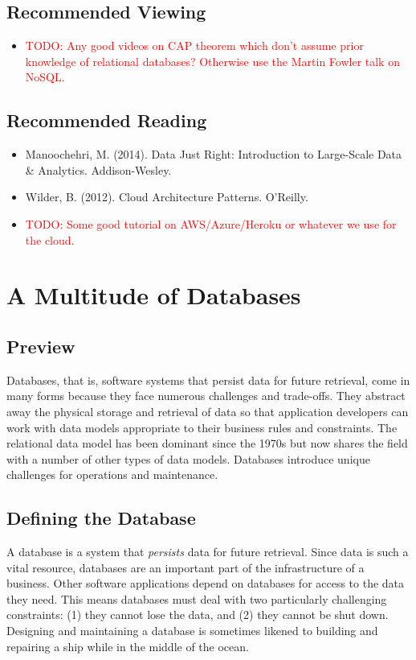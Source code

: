 \documentclass[11pt]{book}
\newcommand{\term}[1]{\emph{#1}} %
\newcommand{\todo}[1]{\textcolor{red}{TODO: #1}} %
\begin{document}
\section*{Recommended Viewing}
\begin{itemize}
    \item \todo{Any good videos on CAP theorem which don't assume prior knowledge of relational databases?  Otherwise use the Martin Fowler talk on NoSQL.}
\end{itemize}

\section*{Recommended Reading}
\begin{itemize}
    \item Manoochehri, M. (2014). Data Just Right: Introduction to Large-Scale Data \& Analytics. Addison-Wesley.
    \item Wilder, B. (2012). Cloud Architecture Patterns. O'Reilly.
    \item \todo{Some good tutorial on AWS/Azure/Heroku or whatever we use for the cloud.}
\end{itemize}









\chapter{A Multitude of Databases}\label{ch:nosql}

\section*{Preview}

Databases, that is, software systems that persist data for future retrieval, come in many forms because they face numerous challenges and trade-offs.  They abstract away the physical storage and retrieval of data so that application developers can work with data models appropriate to their business rules and constraints.  The relational data model has been dominant since the 1970s but now shares the field with a number of other types of data models.  Databases introduce unique challenges for operations and maintenance.

\section{Defining the Database}
A database is a system that \term{persists} data for future retrieval.  Since data is such a vital resource, databases are an important part of the infrastructure of a business.  Other software applications depend on databases for access to the data they need.  This means databases must deal with two particularly challenging constraints: (1) they cannot lose the data, and (2) they cannot be shut down.  Designing and maintaining a database is sometimes likened to building and repairing a ship while in the middle of the ocean.
\end{document}
